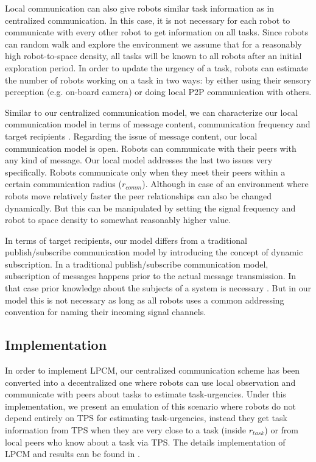 \documentclass{intech}
\begin{document}
Local communication can also give robots similar task information as in centralized communication. In this case, it is not necessary for each robot to communicate with every other robot to get information on all tasks. Since robots can random walk and explore the environment we assume that for a reasonably high robot-to-space density, all tasks will be known to all robots after an initial exploration period. In order to update the urgency of a task, robots can estimate the number of robots working on a task in two ways:  by either using their sensory perception (e.g. on-board camera) or  doing local P2P communication with others.

Similar to our centralized communication model, we can characterize our local communication model in terms of message content, communication frequency and target recipients \cite{Gerkey+2001}. Regarding the issue of message content, our local communication model is open. Robots can communicate with their peers with any kind of message. Our local model addresses the last two issues very specifically. Robots communicate only when they meet their peers within a certain communication radius ($r_{comm}$). Although in case of an environment where robots move relatively faster the peer relationships can also be changed dynamically. But this can be manipulated by setting the signal frequency and robot to space density to somewhat reasonably higher value.

In terms of target recipients, our model differs from a traditional publish/subscribe communication model by introducing the concept of dynamic subscription. In a traditional publish/subscribe communication model, subscription of messages happens prior to the actual message transmission. In that case prior knowledge about the subjects of a system is necessary \citep{Gerkey+2001}. But in our model this is not necessary as long as all robots uses a common addressing convention for naming their incoming signal channels.
%
\subsection{Implementation}
In order to implement LPCM, our centralized communication scheme has been converted into a decentralized one where robots can use local observation and communicate with peers about tasks to estimate task-urgencies. Under this implementation, we present an emulation of this scenario where robots do not depend entirely on TPS for estimating task-urgencies, instead they get task information from TPS when they are very close to a task (inside $r_{task}$) or from local peers who know about a task via TPS.   The details implementation of LPCM and results can be found in \cite{Sarker2010thesis}.
%
\end{document}
